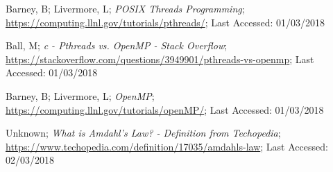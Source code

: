\documentclass[10pt, conference]{IEEEtran}
\begin{document}
\begin{thebibliography}{}

Barney, B; Livermore, L; \emph{POSIX Threads Programming}; \url{https://computing.llnl.gov/tutorials/pthreads/}; Last Accessed: 01/03/2018

Ball, M; \emph{c - Pthreads vs. OpenMP - Stack Overflow}; \url{https://stackoverflow.com/questions/3949901/pthreads-vs-openmp}; Last Accessed: 01/03/2018

Barney, B; Livermore, L; \emph{OpenMP}; \url{https://computing.llnl.gov/tutorials/openMP/}; Last Accessed: 01/03/2018

Unknown; \emph{What is Amdahl's Law? - Definition from Techopedia}; \url{https://www.techopedia.com/definition/17035/amdahls-law}; Last Accessed: 02/03/2018

\end{thebibliography}
\end{document}
